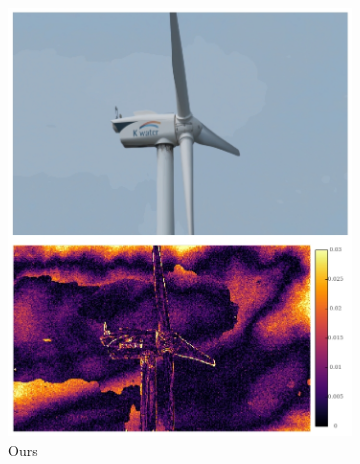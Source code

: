 \documentclass{article}
\begin{document}
\begin{figure}
\begin{subfigure}{0.25\textwidth}
	\centering
    \includegraphics[width=1\linewidth]{qua_imgs/TEST02_045_f0465_ours.jpg}
    \caption{Ours}
\end{subfigure}%
\begin{subfigure}{0.25\textwidth}
	\centering

\end{subfigure}
\end{figure}
\end{document}
